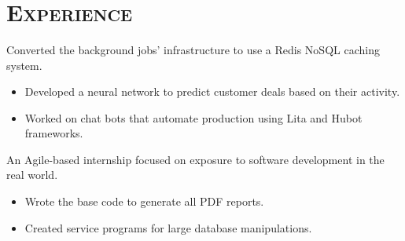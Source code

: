 \begin{resume}
\begin{formatb}
  \\
  \\
  \body\\
\end{formatb}

\section{\textsc{Experience}}
\begin{position}
  Converted the background jobs' infrastructure to use a Redis NoSQL caching system.
\begin{itemize}
\item Developed a neural network to predict customer deals based on their activity.
\end{itemize}
\begin{itemize}
\item Worked on chat bots that automate production using Lita and Hubot frameworks.
\end{itemize}
\end{position}

\begin{position}
  An Agile-based internship focused on exposure to software development in the real world.
\begin{itemize}
\item Wrote the base code to generate all PDF reports.
\end{itemize}
\begin{itemize}
\item Created service programs for large database manipulations.
\end{itemize}
\end{position}


\end{resume}
